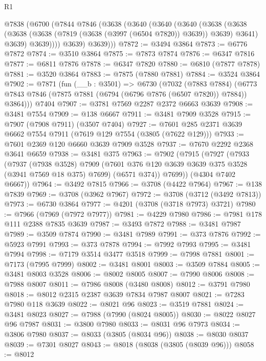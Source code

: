 \begin{lexlean}{R1}
\begin{coremodule}
    @7838
      (@6700
        (@7844
          @7846
          (@3638
            (@3640
              (@3640
                (@3640
                  (@3638
                    (@3638
                      (@3638 (@3638 (@7819 (@3638 (@3997 (@6504 @7820)) @3639)) @3639) @3641)
                      @3639)
                    @3639))))
            @3639)
          @3639)))
@7872 := @3494 @3864
@7873 := @6776 @7872
@7874 := @3510 @3864
@7875 := @7873 @7874
@7876 := @6347 @7816
@7877 := @6811 @7876
@7878 := @6347 @7820
@7880 := @6810 (@7877 @7878)
@7881 := @3520 @3864
@7883 := @7875 (@7880 @7881)
@7884 := @3524 @3864
@7902 := @7871
    (fun (__b : @3501) =>
    @6730
      (@7032
        (@7883 @7884)
        (@6773 @7843 @7846 (@7875 @7881 (@6794 (@6796 @7876 (@6507 @7820)) @7884)) @3864)))
    @7404
@7907 := @3781 @7569 @2287 @2372 @6663 @3639
@7908 := @3481 @7554
@7909 := @138 @6667
@7911 := @3481 @7909 @3528
@7915 := @7907 (@7908 @7911) (@3507 @7404)
@7927 := @7601 @285 @2371 @3639 @6662 @7554 @7911 (@7619 @129 @7554 (@3805 (@7622 @129)))
@7933 := @7601 @2369 @120 @6660 @3639 @7909 @3528
@7937 := @7670 @2292 @2368 @3641 @6659
@7938 := @3481 @375
@7963 := @7902
    (@7915
      (@7927
        (@7933
          (@7937
            (@7938 @3528)
            @7909
            (@7601 @376 @120 @3639 @3639 @375 @3528 (@3941 @7569 @18 @375) @7699)
            (@6571 @374))
          @7699))
      (@4304 @7402 @6667))
@7964 := @3492 @7815
@7966 := @3708 (@4422 @7964)
@7967 := @138 @7839
@7969 := @3708 (@3962 @7967)
@7972 := @3708 (@3712 (@3492 @7813))
@7973 := @6730 @3864
@7977 := @4201 (@3708 (@3718 @7973) @3721)
@7980 := @7966 (@7969 (@7972 @7977))
@7981 := @4229 @7980
@7986 := @7981 @178 @111 @2388 @7835 @3639
@7987 := @3493 @7872
@7988 := @3481 @7987
@7989 := @3509 @7874
@7990 := @3481 @7989
@7991 := @373 @7876
@7992 := @5923 @7991
@7993 := @373 @7878
@7994 := @7992 @7993
@7995 := @3481 @7994
@7998 := @7179 @3514 @3477 @3518
@7999 := @7998 @7881
@8001 := @7173 (@7995 @7999)
@8002 := @3481 @8001
@8003 := @3509 @7884
@8005 := @3481 @8003 @3528
@8006 := @8002 @8005
@8007 := @7990 @8006
@8008 := @7988 @8007
@8011 := @7986 @8008 (@3480 @8008)
@8012 := @3791 @7980
@8018 := @8012 @2315 @2387 @3639 @7834 @7987 @8007
@8021 := @7283 @7980 @118 @3639
@8022 := @8021 @96
@8023 := @3519 @7881
@8024 := @3481 @8023
@8027 := @7988 (@7990 (@8024 @8005))
@8030 := @8022 @8027 @96 @7987
@8031 := @3800 @7980
@8033 := @8031 @96 @7973
@8034 := @3806 @7980
@8037 := @8033 (@3805 (@8034 @96))
@8038 := @8030 @8037
@8039 := @7301 @8027
@8043 := @8018 (@8038 (@3805 (@8039 @96)))
@8058 := @8012

\end{coremodule}
\end{lexlean}
